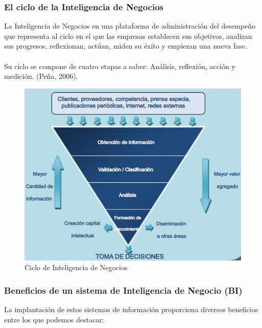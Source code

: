 \documentclass[preprint,12pt]{elsarticle}
\begin{document}

\subsubsection{\textbf{El ciclo de la Inteligencia de Negocios}}

La Inteligencia de Negocios en una plataforma de administración del desempeño que representa al ciclo en el que las empresas establecen sus objetivos, analizan sus progresos, reflexionan, actúan, miden su éxito y empiezan una nueva fase. \\ \\Su ciclo se compone de cuatro etapas a saber: Análisis, reflexión, acción y medición. (Peña, 2006).

\begin{figure}[htb]
	\begin{center}
		\includegraphics[width=12cm]{./IMAGENES/ciclo_BI} 
		\caption{Ciclo de Inteligencia de Negocios}
	\end{center}
\end{figure}

	\subsubsection{\textbf{Beneficios de un sistema de Inteligencia de Negocio (BI)}}
	La implantación de estos sistemas de información proporciona diversos beneficios entre los que podemos destacar:
\end{document}
